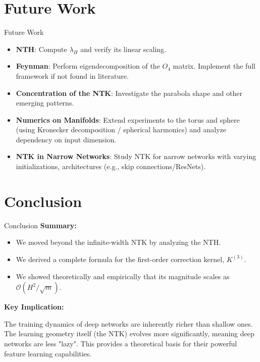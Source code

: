 \documentclass{beamer}
\newcommand{\Order}{\mathcal{O}}
\begin{document}
\section{Future Work}
\begin{frame}{Future Work}
\begin{itemize}
    \item \textbf{NTH}: Compute $\lambda_H$ and verify its linear scaling.
    \item \textbf{Feynman}: Perform eigendecomposition of the $O_4$ matrix. Implement the full framework if not found in literature.
    \item \textbf{Concentration of the NTK}: Investigate the parabola shape and other emerging patterns.
    \item \textbf{Numerics on Manifolds}: Extend experiments to the torus and sphere (using Kronecker decomposition / spherical harmonics) and analyze dependency on input dimension.
    \item \textbf{NTK in Narrow Networks}: Study NTK for narrow networks with varying initializations, architectures (e.g., skip connections/ResNets).
\end{itemize}
\end{frame}

\section{Conclusion}

\begin{frame}{Conclusion}
\textbf{Summary:}
\begin{itemize}
    \item We moved beyond the infinite-width NTK by analyzing the NTH.
    \item We derived a complete formula for the first-order correction kernel, $K^{(3)}$.
    \item We showed theoretically and empirically that its magnitude scales as $\Order(H^2/\sqrt{m})$.
\end{itemize}
\vspace{1cm}
\textbf{Key Implication:}
\begin{alertblock}
The training dynamics of deep networks are inherently richer than shallow ones. The learning geometry itself (the NTK) evolves more significantly, meaning deep networks are less "lazy". This provides a theoretical basis for their powerful feature learning capabilities.
\end{alertblock}
\end{frame}
\end{document}
